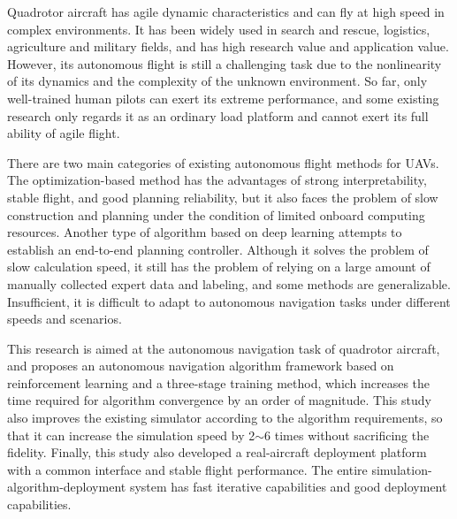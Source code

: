 \begin{abstract*}

  Quadrotor aircraft has agile dynamic characteristics and can fly at high speed in complex environments. It has been widely used in search and rescue, logistics, agriculture and military fields, and has high research value and application value. However, its autonomous flight is still a challenging task due to the nonlinearity of its dynamics and the complexity of the unknown environment. So far, only well-trained human pilots can exert its extreme performance, and some existing research only regards it as an ordinary load platform and cannot exert its full ability of agile flight.

  There are two main categories of existing autonomous flight methods for UAVs. The optimization-based method has the advantages of strong interpretability, stable flight, and good planning reliability, but it also faces the problem of slow construction and planning under the condition of limited onboard computing resources. Another type of algorithm based on deep learning attempts to establish an end-to-end planning controller. Although it solves the problem of slow calculation speed, it still has the problem of relying on a large amount of manually collected expert data and labeling, and some methods are generalizable. Insufficient, it is difficult to adapt to autonomous navigation tasks under different speeds and scenarios.

  This research is aimed at the autonomous navigation task of quadrotor aircraft, and proposes an autonomous navigation algorithm framework based on reinforcement learning and a three-stage training method, which increases the time required for algorithm convergence by an order of magnitude. This study also improves the existing simulator according to the algorithm requirements, so that it can increase the simulation speed by 2$\sim$6 times without sacrificing the fidelity. Finally, this study also developed a real-aircraft deployment platform with a common interface and stable flight performance. The entire simulation-algorithm-deployment system has fast iterative capabilities and good deployment capabilities.

\end{abstract*}
